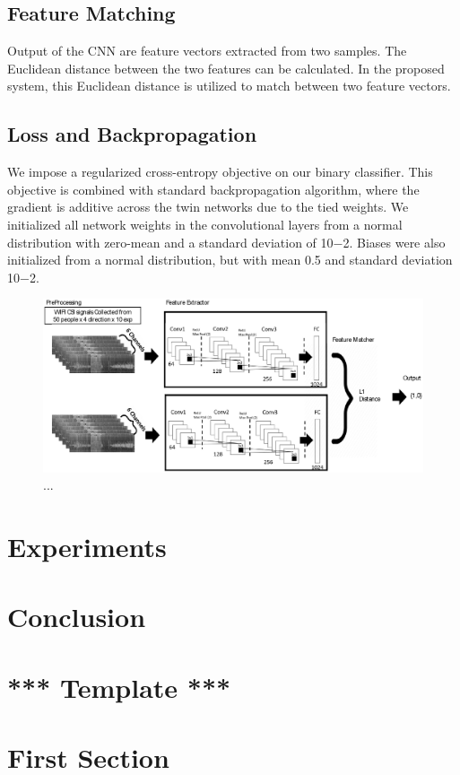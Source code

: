\documentclass[runningheads]{llncs}
\begin{document}
\subsection{Feature Matching}
Output of the CNN are feature vectors extracted from two samples. The Euclidean distance between the two features can be calculated.
In the proposed system, this Euclidean distance is utilized to match between two feature vectors.

\subsection{Loss and Backpropagation}
 We impose a regularized cross-entropy objective on our binary classifier.
This objective is combined with standard backpropagation algorithm, where the gradient is additive across the twin networks due to the tied weights.
 We initialized all network weights in the convolutional layers from a normal distribution with zero-mean and a standard deviation of 10−2. Biases were also initialized from a normal distribution, but with mean 0.5 and standard deviation 10−2.
\begin{figure}
\includegraphics[width=\textwidth]{network1.eps}
\caption{...} \label{network1}
\end{figure}

\section{Experiments}
\section{Conclusion}

\section{*** Template ***}
\section{First Section}
\end{document}
